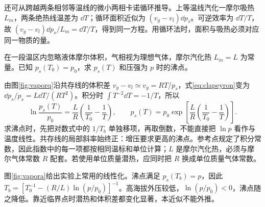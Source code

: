 还可从跨越两条相邻等温线的微小两相卡诺循环推导。上等温线汽化一摩尔吸热 $L_m$，两条绝热线温差为 $\dd T$；循环面积近似为 $(v_g-v_l)\dd p_s$。可逆效率为 $\dd T/T$，故 $(v_g-v_l)\dd p_s/L_m=\dd T/T$，得到同一方程。用循环法时，面积与吸热必须对应同一物质的量。


\begin{example}[饱和蒸气压的指数近似]\label{ex:vaporpressure}
在一段温区内忽略液体摩尔体积，气相视为理想气体，摩尔汽化热 $L_m=L$ 为常量。已知 $p_s(T_0)=p_0$，求 $p_s(T)$ 和压强为 $p$ 时的沸点。
\end{example}
\begin{solution}
由图\ref{fig:vaporq}沿共存线的体积差 $v_g-v_l\simeq v_g=RT/p_s$，式\eqref{eq:clapeyron}变为 $\dd p_s/p_s=L\dd T/(RT^2)$。积分时 $\int T^{-2}\dd T=-1/T$，所以
\[
 \ln\frac{p_s(T)}{p_0}=\frac LR\left(\frac1{T_0}-\frac1T\right),\qquad
 p_s(T)=p_0\exp\!\left[\frac LR\left(\frac1{T_0}-\frac1T\right)\right].
\]
求沸点时，先把对数式中的 $1/T_b$ 单独移项，再取倒数，不能直接把 $\ln p$ 看作与温度线性。共存线的局部斜率始终正：增压要求更高的沸点。参考点规定了积分常数，因此指数中的每一项都按相同温标和单位计算；$L$ 是摩尔汽化热，必须与摩尔气体常数 $R$ 配套。若使用单位质量潜热，应同时把 $R$ 换成单位质量气体常数。

图\ref{fig:vapora}给出实验上常用的线性化。沸点满足 $p_s(T_b)=p$，因此 $T_b=[T_0^{-1}-(R/L)\ln(p/p_0)]^{-1}$。高海拔外压较低，$\ln(p/p_0)<0$，沸点随之降低。靠近临界点时潜热和体积差都变化显著，本近似不能外推。
\end{solution}

